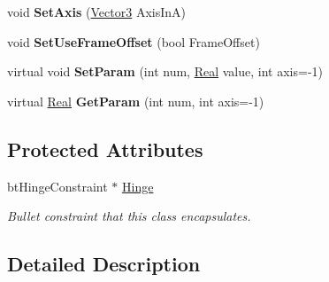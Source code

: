 \begin{DoxyCompactItemize}
\item 
\hypertarget{classphys_1_1HingeConstraint_a25b0004ae13f202cff82f7aaa3722d98}{
void {\bfseries SetAxis} (\hyperlink{classphys_1_1Vector3}{Vector3} AxisInA)}
\label{d3/d0d/classphys_1_1HingeConstraint_a25b0004ae13f202cff82f7aaa3722d98}

\item 
\hypertarget{classphys_1_1HingeConstraint_a06a8ac244cefe64c2ce865e608cb2f41}{
void {\bfseries SetUseFrameOffset} (bool FrameOffset)}
\label{d3/d0d/classphys_1_1HingeConstraint_a06a8ac244cefe64c2ce865e608cb2f41}

\item 
\hypertarget{classphys_1_1HingeConstraint_adec79d062d67532e3521eaae6b49f877}{
virtual void {\bfseries SetParam} (int num, \hyperlink{namespacephys_af7eb897198d265b8e868f45240230d5f}{Real} value, int axis=-\/1)}
\label{d3/d0d/classphys_1_1HingeConstraint_adec79d062d67532e3521eaae6b49f877}

\item 
\hypertarget{classphys_1_1HingeConstraint_a7e8c001ee6291bf457c9860124cacaf8}{
virtual \hyperlink{namespacephys_af7eb897198d265b8e868f45240230d5f}{Real} {\bfseries GetParam} (int num, int axis=-\/1)}
\label{d3/d0d/classphys_1_1HingeConstraint_a7e8c001ee6291bf457c9860124cacaf8}

\end{DoxyCompactItemize}
\subsection*{Protected Attributes}
\begin{DoxyCompactItemize}
\item 
\hypertarget{classphys_1_1HingeConstraint_afa4e4f1595d6420f21449d5e3b730f49}{
btHingeConstraint $\ast$ \hyperlink{classphys_1_1HingeConstraint_afa4e4f1595d6420f21449d5e3b730f49}{Hinge}}
\label{d3/d0d/classphys_1_1HingeConstraint_afa4e4f1595d6420f21449d5e3b730f49}

\begin{DoxyCompactList}\small\item\em Bullet constraint that this class encapsulates. \item\end{DoxyCompactList}\end{DoxyCompactItemize}


\subsection{Detailed Description}


